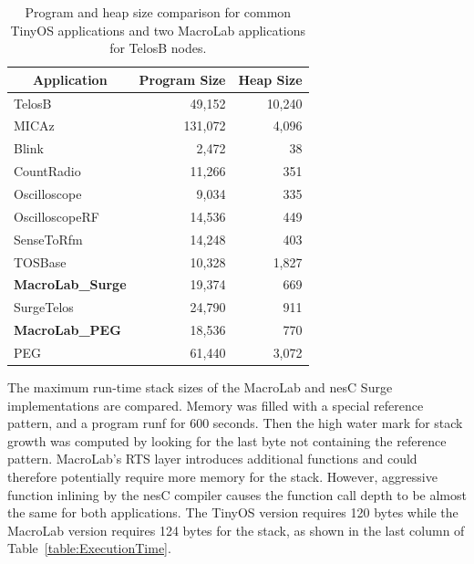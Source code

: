 \begin{table}[!htb]
  \centering
  \begin{minipage}{\columnwidth}
    \centering
    \begin{tabular}{|l|r|r|}
      \hline
      \multicolumn{1}{|c}{Application} & \multicolumn{1}{|c|}{Program Size} & \multicolumn{1}{c|}{Heap Size}\\
      \hline
      TelosB&49,152&10,240\\
      MICAz&131,072&4,096\\
      \hline
      Blink&2,472&38\\
      CountRadio&11,266&351\\
      Oscilloscope&9,034&335\\
      OscilloscopeRF&14,536&449\\
      SenseToRfm&14,248&403\\
      TOSBase&10,328&1,827\\
      \bf{MacroLab\_Surge}&19,374&669\\
      SurgeTelos&24,790&911\\
      \bf{MacroLab\_PEG}&18,536&770\\
      PEG~\cite{Sharp}&61,440&3,072\\
      \hline
    \end{tabular}
  \end{minipage}
  \caption[MacroLab code size evaluation]{Program and heap size comparison for common TinyOS applications and two
  MacroLab applications for TelosB nodes.}
  \label{table:CodeSize}
\end{table}

The maximum run-time stack sizes of the MacroLab and nesC Surge implementations
are compared. Memory was filled with a special reference pattern, and a program
runf for 600 seconds. Then the high water mark for stack growth was computed by
looking for the last byte not containing the reference pattern.  MacroLab's RTS
layer introduces additional functions and could therefore potentially require
more memory for the stack.  However, aggressive function inlining by the nesC
compiler causes the function call depth to be almost the same for both
applications. The TinyOS version requires 120 bytes while the MacroLab version
requires 124 bytes for the stack, as shown in the last column of
Table~\ref{table:ExecutionTime}.

